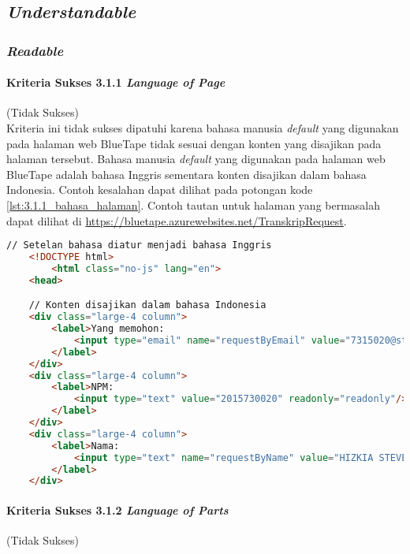 \subsection{\textit{Understandable}}
\label{subsec:kepatuhan_bluetape_understandable}

\subsubsection{\textit{Readable}}
\label{subsubsec:kepatuhan_bluetape_readable}

\paragraph{Kriteria Sukses 3.1.1 \textit{Language of Page}}
\label{par:kepatuhan_bluetape_kriteria_sukses_3.1.1}
(Tidak Sukses)\\

Kriteria ini tidak sukses dipatuhi karena bahasa manusia \textit{default} yang digunakan pada halaman web BlueTape tidak sesuai dengan konten yang disajikan pada halaman tersebut. Bahasa manusia \textit{default} yang digunakan pada halaman web BlueTape adalah bahasa Inggris sementara konten disajikan dalam bahasa Indonesia. Contoh kesalahan dapat dilihat pada potongan kode \ref{lst:3.1.1_bahasa_halaman}. Contoh tautan untuk halaman yang bermasalah dapat dilihat di \url{https://bluetape.azurewebsites.net/TranskripRequest}.

\begin{lstlisting}[frame=single, label={lst:3.1.1_bahasa_halaman}, language=HTML, caption=Kriteria Sukses 3.1.1 - Bahasa yang Tidak Sesuai]
    // Setelan bahasa diatur menjadi bahasa Inggris
    <!DOCTYPE html>
        <html class="no-js" lang="en">
    <head>

    // Konten disajikan dalam bahasa Indonesia
    <div class="large-4 column">
        <label>Yang memohon:
            <input type="email" name="requestByEmail" value="7315020@student.unpar.ac.id" readonly="readonly"/>
        </label>
    </div>
    <div class="large-4 column">
        <label>NPM:
            <input type="text" value="2015730020" readonly="readonly"/>
        </label>
    </div>
    <div class="large-4 column">
        <label>Nama:
            <input type="text" name="requestByName" value="HIZKIA STEVEN" readonly="readonly"/>
        </label>
    </div>
\end{lstlisting}

\paragraph{Kriteria Sukses 3.1.2 \textit{Language of Parts}}
\label{par:kepatuhan_bluetape_kriteria_sukses_3.1.2}
(Tidak Sukses)\\


